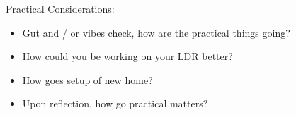 
	\item Practical Considerations:
	\begin{itemize}
		\item Gut and / or vibes check, how are the practical things going?

		\item How could you be working on your LDR better?

		\item How goes setup of new home?

		\item Upon reflection, how go practical matters?

	\end{itemize}
